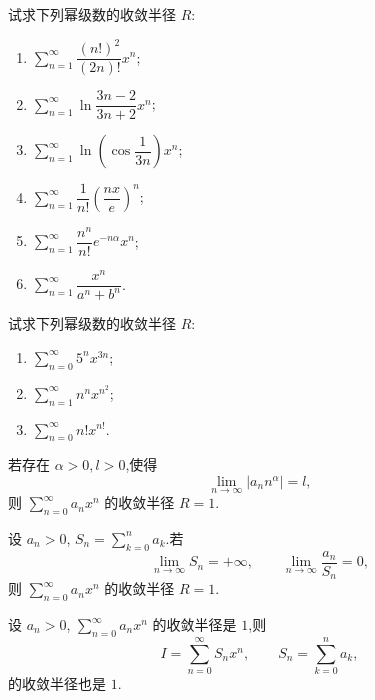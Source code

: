 \documentclass[../数学分析培优讲义.tex]{subfiles}
\begin{document}
\begin{example}
试求下列幂级数的收敛半径 $R$:
\begin{enumerate}[label=(\arabic*)]
    \item $\displaystyle\sum\limits_{n=1}^{\infty}\dfrac{(n!)^2}{(2n)!}x^n$;
    \item $\displaystyle\sum\limits_{n=1}^{\infty}\ln\dfrac{3n-2}{3n+2}x^n$;
    \item $\displaystyle\sum\limits_{n=1}^{\infty}\ln\left(\cos\dfrac{1}{3n}\right)x^n$;
    \item $\displaystyle\sum\limits_{n=1}^{\infty}\dfrac{1}{n!}\left(\dfrac{nx}{e}\right)^n$;
    \item $\displaystyle\sum\limits_{n=1}^{\infty}\dfrac{n^n}{n!}e^{-n\alpha}x^n$;
    \item $\displaystyle\sum\limits_{n=1}^{\infty}\dfrac{x^n}{a^n+b^n}$.
\end{enumerate}
\end{example}
\exampleblank

\begin{example}
试求下列幂级数的收敛半径 $R$:
\begin{enumerate}[label=(\arabic*)]
    \item $\displaystyle\sum\limits_{n=0}^{\infty}5^n x^{3n}$;
    \item $\displaystyle\sum\limits_{n=1}^{\infty}n^n x^{n^2}$;
    \item $\displaystyle\sum\limits_{n=0}^{\infty}n!x^{n!}$.
\end{enumerate}
\end{example}
\exampleblank

\begin{example}
若存在 $\alpha>0,l>0$,使得
\[
    \lim\limits_{n\to\infty}|a_nn^\alpha|=l,
\]
则 $\displaystyle\sum\limits_{n=0}^{\infty}a_nx^n$ 的收敛半径 $R=1$.
\end{example}
\exampleblank

\begin{example}
设 $a_n>0$, $S_n=\displaystyle\sum\limits_{k=0}^{n}a_k$.若
\[
    \lim\limits_{n\to\infty}S_n=+\infty,
    \qquad
    \lim\limits_{n\to\infty}\dfrac{a_n}{S_n}=0,
\]
则 $\displaystyle\sum\limits_{n=0}^{\infty}a_nx^n$ 的收敛半径 $R=1$.
\end{example}
\exampleblank

\begin{example}
设 $a_n>0$, $\displaystyle\sum\limits_{n=0}^{\infty}a_nx^n$ 的收敛半径是 $1$,则
\[
    I=\sum\limits_{n=0}^{\infty}S_nx^n,
    \qquad
    S_n=\sum\limits_{k=0}^{n}a_k,
\]
的收敛半径也是 $1$.
\end{example}
\exampleblank
\end{document}
